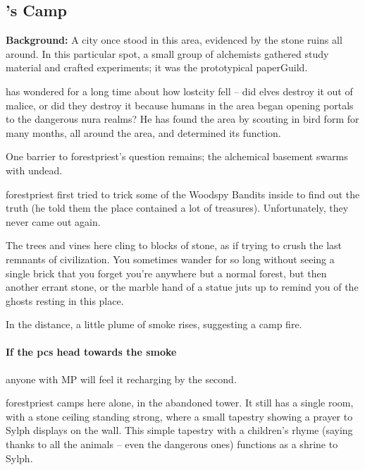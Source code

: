 \subsection{'s Camp}
\label{lostcity}

\textbf{Background:}
A city once stood in this area, evidenced by the stone ruins all around.
In this particular spot, a small group of alchemists gathered study material and crafted experiments; it was the prototypical \gls{paperGuild}.

 has wondered for a long time about how \gls{lostcity} fell -- did elves destroy it out of malice, or did they destroy it because humans in the area began opening portals to the dangerous nura realms?
He has found the area by scouting in bird form for many months, all around the area, and determined its function.

One barrier to \gls{forestpriest}'s question remains; the alchemical basement swarms with undead.

\Gls{forestpriest} first tried to trick some of the Woodspy Bandits inside to find out the truth (he told them the place contained a lot of treasures).
Unfortunately, they never came out again.

\begin{boxtext}

  The trees and vines here cling to blocks of stone, as if trying to crush the last remnants of civilization.
  You sometimes wander for so long without seeing a single brick that you forget you're anywhere but a normal forest, but then another errant stone, or the marble hand of a statue juts up to remind you of the ghosts resting in this place.

  In the distance, a little plume of smoke rises, suggesting a camp fire.

\end{boxtext}

\paragraph{If the \glspl{pc} head towards the smoke}
anyone with MP will feel it recharging by the second.


\Gls{forestpriest} camps here alone, in the abandoned tower.
It still has a single room, with a stone ceiling standing strong, where a small tapestry showing a prayer to Sylph displays on the wall.
This simple tapestry with a children's rhyme (saying thanks to all the animals -- even the dangerous ones) functions as a shrine to Sylph.

